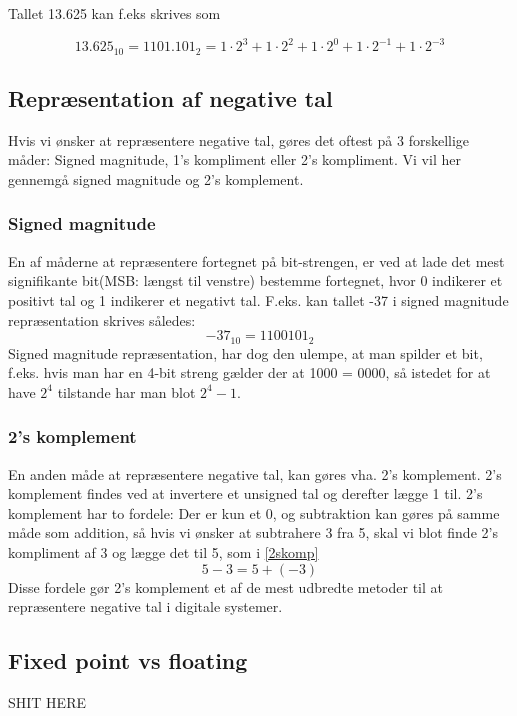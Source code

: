 Tallet 13.625 kan f.eks skrives som

\begin{equation}
13.625_{10} = 1101.101_2 = 1 \cdot 2^3+1 \cdot 2^2+1 \cdot 2^0+1 \cdot 2^{-1}+1 \cdot 2^{-3}
\end{equation}

\subsection{Repræsentation af negative tal}
Hvis vi ønsker at repræsentere negative tal, gøres det oftest på 3 forskellige måder: 
Signed magnitude, 1's kompliment eller 2's kompliment. Vi vil her gennemgå signed magnitude og 2's komplement.
\subsubsection{Signed magnitude}
En af måderne at repræsentere fortegnet på bit-strengen, er ved at lade det mest signifikante bit(MSB: længst til venstre) bestemme fortegnet, hvor 0 indikerer et positivt tal og 1 indikerer et negativt tal.  F.eks. kan tallet -37 i signed magnitude repræsentation skrives således:
\begin{equation}
-37_{10} = 1100101_2 
\end{equation}
Signed magnitude repræsentation, har dog den ulempe, at man spilder et bit, f.eks. hvis man har en 4-bit streng gælder der at 1000 =  0000, så istedet for at have $2^4$ tilstande har man blot $2^4-1$. 
\subsubsection{2's komplement}
En anden måde at repræsentere negative tal, kan gøres vha. 2's komplement. 2's komplement findes ved at invertere et unsigned tal og derefter lægge 1 til. 2's komplement har to fordele: Der er kun et 0, og subtraktion kan gøres på samme måde som addition, så hvis vi ønsker at subtrahere 3 fra 5, skal vi blot finde 2's kompliment af 3 og lægge det til 5, som i \ref{2skomp}
\begin{equation}
\label{2skomp}
 5-3 = 5+(-3)
\end{equation}
Disse fordele gør 2's komplement et af de mest udbredte metoder til at repræsentere negative tal i digitale systemer.

\subsection{Fixed point vs floating}
SHIT HERE
